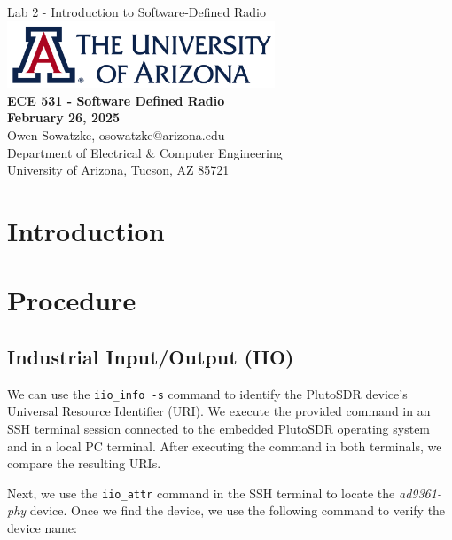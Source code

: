 \documentclass{article}
\begin{document}
\begin{titlepage}
	\centering
	{\huge Lab 2 - Introduction to Software-Defined Radio}\\[0.25 in]
	\includegraphics[width=0.6\textwidth]{ua_logo.png}\\[0.25 in]
	{\large \textbf{ECE 531 - Software Defined Radio\\[0.25 in]
	February 26, 2025\\[0.25 in]}}
	{\large Owen Sowatzke, osowatzke@arizona.edu\\[0.05 in]
	Department of Electrical \& Computer Engineering\\[0.05 in]
	University of Arizona, Tucson, AZ 85721\\[0.5 in]}
	\hypersetup{linkcolor=navy-blue}
	\noindent\hrulefill
	\tableofcontents
	\noindent\hrulefill
\end{titlepage}

\setlength{\parindent}{0pt}

\section{Introduction}

\section{Procedure}

\subsection{Industrial Input/Output (IIO)}

We can use the \texttt{iio\_info -s} command to identify the PlutoSDR device's Universal Resource Identifier (URI). We execute the provided command in an SSH terminal session connected to the embedded PlutoSDR operating system and in a local PC terminal. After executing the command in both terminals, we compare the resulting URIs.

Next, we use the \texttt{iio\_attr} command in the SSH terminal to locate the \textit{ad9361-phy} device. Once we find the device, we use the following command to verify the device name:
\end{document}
